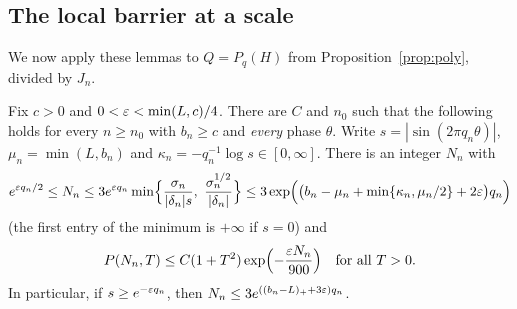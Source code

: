 \subsection{The local barrier at a scale}

We now apply these lemmas to $Q=P_q(H)$ from Proposition~\ref{prop:poly}, divided by $J_n$.

\begin{proposition}\label{prop:local}
Fix $c>0$ and $0<\varepsilon<\min(L,c)/4$. There are $C$ and $n_0$ such that the following holds for every $n\ge n_0$ with $b_n\ge c$ and \emph{every} phase $\theta$. Write $s=|\sin(2\pi q_n\theta)|$, $\mu_n=\min(L,b_n)$ and $\kappa_n=-q_n^{-1}\log s\in[0,\infty]$. There is an integer $N_n$ with
\begin{equation}\label{eq:Nn}
e^{\eps q_n/2}\le N_n\le 3e^{\eps q_n}\min\Bigl\{\frac{\sigma_n}{|\delta_n|s},\ \frac{\sigma_n^{1/2}}{|\delta_n|}\Bigr\}\le 3\exp\Bigl(\bigl(b_n-\mu_n+\min\{\kappa_n,\mu_n/2\}+2\eps\bigr)q_n\Bigr)
\end{equation}
(the first entry of the minimum is $+\infty$ if $s=0$) and
\[
P(N_n,T)\le C(1+T^2)\exp\Bigl(-\frac{\varepsilon N_n}{900}\Bigr)\quad\text{for all }T>0.
\]
In particular, if $s\ge e^{-\varepsilon q_n}$, then $N_n\le3e^{((b_n-L)_++3\varepsilon)q_n}$.
\end{proposition}

